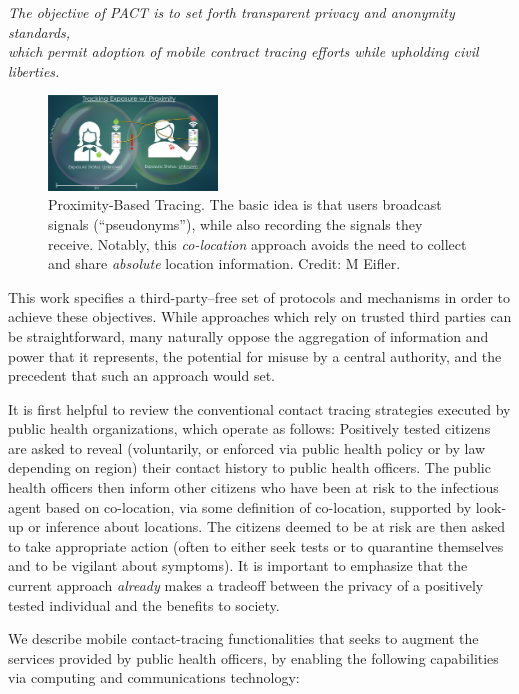 \begin{center}
\emph{The objective of PACT is to set forth transparent privacy and
  anonymity standards,\\
  which permit adoption of mobile contract tracing efforts while upholding civil liberties.}
\end{center}

\begin{figure}
\centering
\includegraphics[width=0.4\textwidth]{fig_bubble}
\caption{\label{fig:bubble} Proximity-Based Tracing. The basic idea is that users broadcast signals (``pseudonyms''), while also recording the signals they receive. Notably, this \emph{co-location} approach
avoids the need to collect and share \emph{absolute} location information.
Credit: M Eifler.}
\end{figure}

This work specifies a third-party--free set of protocols and mechanisms in order to achieve these objectives. While approaches which rely on trusted third parties can be straightforward, many naturally oppose the aggregation of information and power that it represents, the potential for misuse by a central authority, and the precedent that such an approach would set.

It is first helpful to review the conventional contact tracing strategies executed by public health organizations, which operate as follows: Positively tested citizens are asked to reveal (voluntarily, or enforced via public health policy or by law depending on region) their contact history to public health officers. The public health officers then inform other citizens who have been at risk to the infectious agent based on co-location, via some definition of co-location, supported by look-up or inference about locations. The citizens deemed to be at risk are then asked to take appropriate action (often to either seek tests or to quarantine
themselves and to be vigilant about symptoms).  It is important to emphasize that the current approach \emph{already} makes a tradeoff between the privacy of a positively tested individual and the benefits to society.


We describe mobile contact-tracing functionalities that seeks to augment the services provided by public health officers, by enabling the following capabilities via computing and communications technology:

